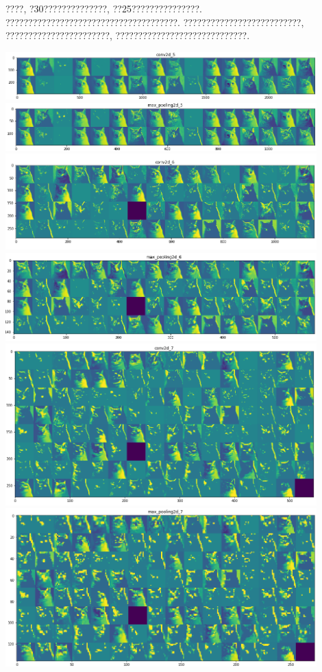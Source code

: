 \documentclass[lang=cn,11pt]{elegantpaper}
\begin{document}
????, ?30??????????????, ??25???????????????. ??????????????????????????????????????. ??????????????????????????, ???????????????????????, ?????????????????????????????. 
\begin{center}
\includegraphics[width=0.9\textwidth]{conv2d_5.png}\\
\includegraphics[width=0.9\textwidth]{max_pooling2d_5}\\
\includegraphics[width=0.9\textwidth]{conv2d_6}\\
\includegraphics[width=0.9\textwidth]{max_pooling2d_6}\\
\includegraphics[width=0.9\textwidth]{conv2d_7}\\
\includegraphics[width=0.9\textwidth]{max_pooling2d_7}\\

\end{center}
\end{document}
